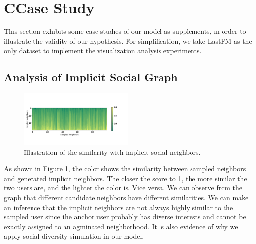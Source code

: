\documentclass[letterpaper]{article} %
\begin{document}
\section{C{\quad}Case Study}
This section exhibits some case studies of our model as supplements, in order to illustrate the validity of our hypothesis. For simplification, we take LastFM as the only dataset to implement the visualization analysis experiments. 
\subsection{Analysis of Implicit Social Graph}
\begin{figure}[ht!]
  \centering
  \includegraphics[width=0.5\textwidth]{implicit.pdf} %
  \caption{Illustration of the similarity with implicit social neighbors.}
  \label{fig_implicit}
\end{figure}
\noindent As shown in Figure \ref{fig_implicit}, the color shows the similarity between sampled neighbors and generated implicit neighbors. The closer the score to 1, the more similar the two users are, and the lighter the color is. Vice versa. We can observe from the graph that different candidate neighbors have different similarities. We can make an inference that the implicit neighbors are not always highly similar to the sampled user since the anchor user probably has diverse interests and cannot be exactly assigned to an agminated neighborhood. It is also evidence of why we apply social diversity simulation in our model.
\end{document}
